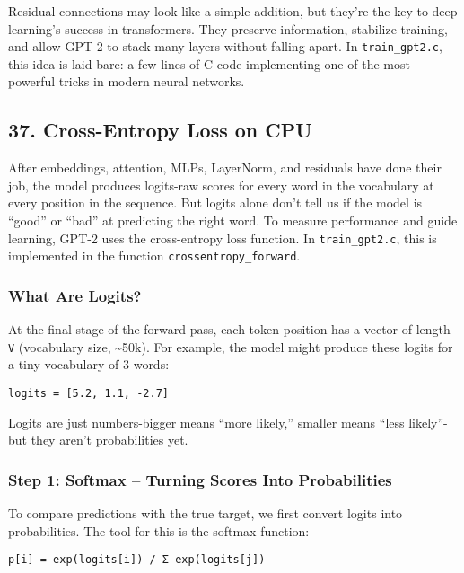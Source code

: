 \documentclass[
  letterpaper,
  DIV=11,
  numbers=noendperiod]{scrreprt}
\begin{document}
Residual connections may look like a simple addition, but they're the
key to deep learning's success in transformers. They preserve
information, stabilize training, and allow GPT-2 to stack many layers
without falling apart. In \texttt{train\_gpt2.c}, this idea is laid
bare: a few lines of C code implementing one of the most powerful tricks
in modern neural networks.

\subsection{37. Cross-Entropy Loss on
CPU}\label{cross-entropy-loss-on-cpu}

After embeddings, attention, MLPs, LayerNorm, and residuals have done
their job, the model produces logits-raw scores for every word in the
vocabulary at every position in the sequence. But logits alone don't
tell us if the model is ``good'' or ``bad'' at predicting the right
word. To measure performance and guide learning, GPT-2 uses the
cross-entropy loss function. In \texttt{train\_gpt2.c}, this is
implemented in the function \texttt{crossentropy\_forward}.

\subsubsection{What Are Logits?}\label{what-are-logits}

At the final stage of the forward pass, each token position has a vector
of length \texttt{V} (vocabulary size, \textasciitilde50k). For example,
the model might produce these logits for a tiny vocabulary of 3 words:

\begin{verbatim}
logits = [5.2, 1.1, -2.7]
\end{verbatim}

Logits are just numbers-bigger means ``more likely,'' smaller means
``less likely''-but they aren't probabilities yet.

\subsubsection{Step 1: Softmax -- Turning Scores Into
Probabilities}\label{step-1-softmax-turning-scores-into-probabilities}

To compare predictions with the true target, we first convert logits
into probabilities. The tool for this is the softmax function:

\begin{verbatim}
p[i] = exp(logits[i]) / Σ exp(logits[j])
\end{verbatim}
\end{document}
